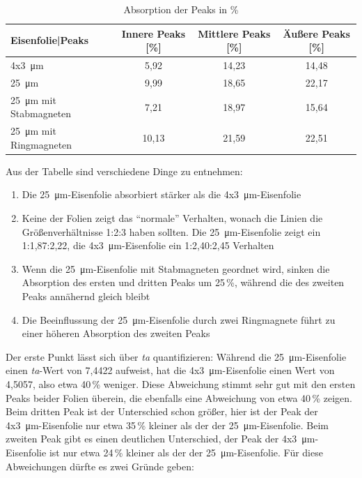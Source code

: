 \documentclass[german, %
parskip=full, %
bibliography=totoc, %
]{scrartcl}
\begin{document}
\begin{table}[ht]
\centering
\begin{tabular}[h]{l|c|c|c}
Eisenfolie|Peaks & Innere Peaks [\%] & Mittlere Peaks [\%] & Äußere Peaks [\%] \\ \hline
4x\SI{3}{\micro\meter} & 5,92 & 14,23 & 14,48 \\ \hline
\SI{25}{\micro\meter} & 9,99 & 18,65 & 22,17 \\ \hline
\SI{25}{\micro\meter} mit Stabmagneten & 7,21 & 18,97 & 15,64 \\ \hline
\SI{25}{\micro\meter} mit Ringmagneten & 10,13 & 21,59 & 22,51
\end{tabular}
\caption{Absorption der Peaks in \%}
\label{tab:absorption}
\end{table}

Aus der Tabelle sind verschiedene Dinge zu entnehmen:
\begin{enumerate}
\item Die \SI{25}{\micro\meter}-Eisenfolie absorbiert stärker als die 4x\SI{3}{\micro\meter}-Eisenfolie
\item Keine der Folien zeigt das "`normale"' Verhalten, wonach die Linien die Größenverhältnisse 1:2:3 haben sollten. Die \SI{25}{\micro\meter}-Eisenfolie zeigt ein 1:1,87:2,22, die 4x\SI{3}{\micro\meter}-Eisenfolie ein 1:2,40:2,45 Verhalten
\item Wenn die \SI{25}{\micro\meter}-Eisenfolie mit Stabmagneten geordnet wird, sinken die Absorption des ersten und dritten Peaks um 25\,\%, während die des zweiten Peaks annähernd gleich bleibt
\item Die Beeinflussung der \SI{25}{\micro\meter}-Eisenfolie durch zwei Ringmagnete führt zu einer höheren Absorption des zweiten Peaks
\end{enumerate}
Der erste Punkt lässt sich über \textit{ta} quantifizieren: Während die \SI{25}{\micro\meter}-Eisenfolie einen \textit{ta}-Wert von 7,4422 aufweist, hat die 4x\SI{3}{\micro\meter}-Eisenfolie einen Wert von 4,5057, also etwa 40\,\% weniger. Diese Abweichung stimmt sehr gut mit den ersten Peaks beider Folien überein, die ebenfalls eine Abweichung von etwa 40\,\% zeigen. Beim dritten Peak ist der Unterschied schon größer, hier ist der Peak der 4x\SI{3}{\micro\meter}-Eisenfolie nur etwa 35\,\% kleiner als der der \SI{25}{\micro\meter}-Eisenfolie. Beim zweiten Peak gibt es einen deutlichen Unterschied, der Peak der 4x\SI{3}{\micro\meter}-Eisenfolie ist nur etwa 24\,\% kleiner als der der \SI{25}{\micro\meter}-Eisenfolie. Für diese Abweichungen dürfte es zwei Gründe geben:
\end{document}
